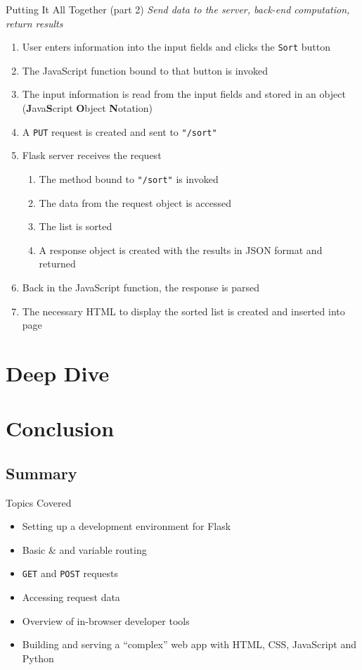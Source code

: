 \documentclass{beamer}
\begin{document}
	\begin{frame}[t]{Putting It All Together (part 2)}
		\setbeamercovered{}
		\textit{Send data to the server, back-end computation, return results}
		\begin{enumerate}
			\item{User enters information into the input fields and clicks
					the \texttt{Sort} button}
			\pause
			\item{The JavaScript function bound to that button is invoked}
			\pause
			\item{The input information is read from the input
					fields and stored in an object
					(\textbf{J}ava\textbf{S}cript \textbf{O}bject
					\textbf{N}otation)}
			\pause
			\item{A \texttt{PUT} request is created and sent to
					\texttt{"/sort"}}
			\pause
			\item{Flask server receives the request
				\begin{enumerate}
					\item{The method bound to \texttt{"/sort"} is
							invoked}
					\pause
					\item{The data from the request object is
							accessed}
					\pause
					\item{The list is sorted}
					\pause
					\item{A response object is created with the results in JSON
							format and returned}
				\end{enumerate}
			}
			\pause
			\item{Back in the JavaScript function, the response is parsed}
			\pause
			\item{The necessary HTML to display the sorted list is created and inserted into page}
		\end{enumerate}
	\end{frame}

\section{Deep Dive}

\section{Conclusion}

\subsection{Summary}
	\begin{frame}[t]{Topics Covered}
		\begin{itemize}
			\item{Setting up a development environment for Flask}
			\item{Basic \& and variable routing}
			\item{\texttt{GET} and \texttt{POST} requests}
			\item{Accessing request data}
			\item{Overview of in-browser developer tools}
			\item{Building and serving a ``complex'' web app with HTML, CSS,
					JavaScript and Python}
		\end{itemize}
	\end{frame}
\end{document}
